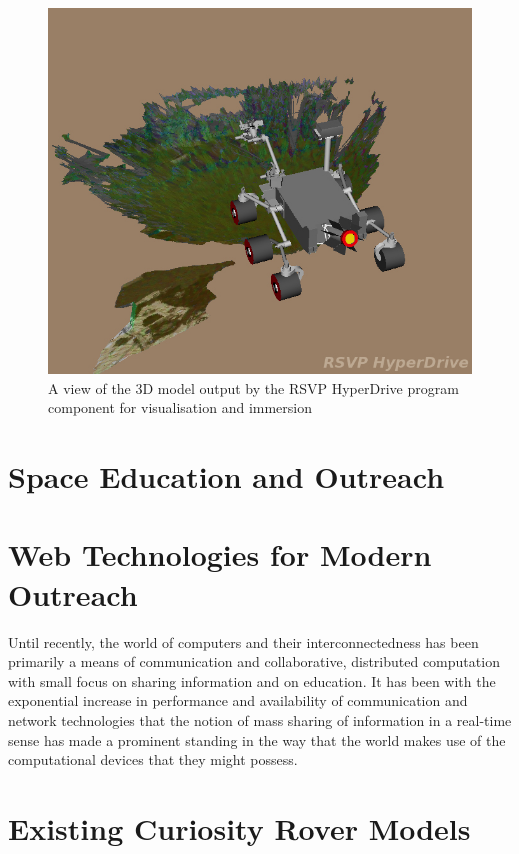      
      \begin{figure}[h]
        \centering
        \includegraphics[width=0.7\linewidth]{figures/litreview-hyperdriveCrop}
        \caption[A view of the 3D model output by the RSVP HyperDrive program component for visualisation and immersion]{A view of the 3D model output by the RSVP HyperDrive program component for visualisation and immersion \cite{fig:litreview-litreview-hyperdrivecrop_cite}}
        \label{fig:litreview-hyperdrivecrop}
      \end{figure}


  \section{Space Education and Outreach}
  
  \section{Web Technologies for Modern Outreach}
    Until recently, the world of computers and their interconnectedness has been primarily a means of communication and collaborative, distributed computation with small focus on sharing information and on education. It has been with the exponential increase in performance and availability of communication and network technologies that the notion of mass sharing of information in a real-time sense has made a prominent standing in the way that the world makes use of the computational devices that they might possess.
  
  \section{Existing Curiosity Rover Models}